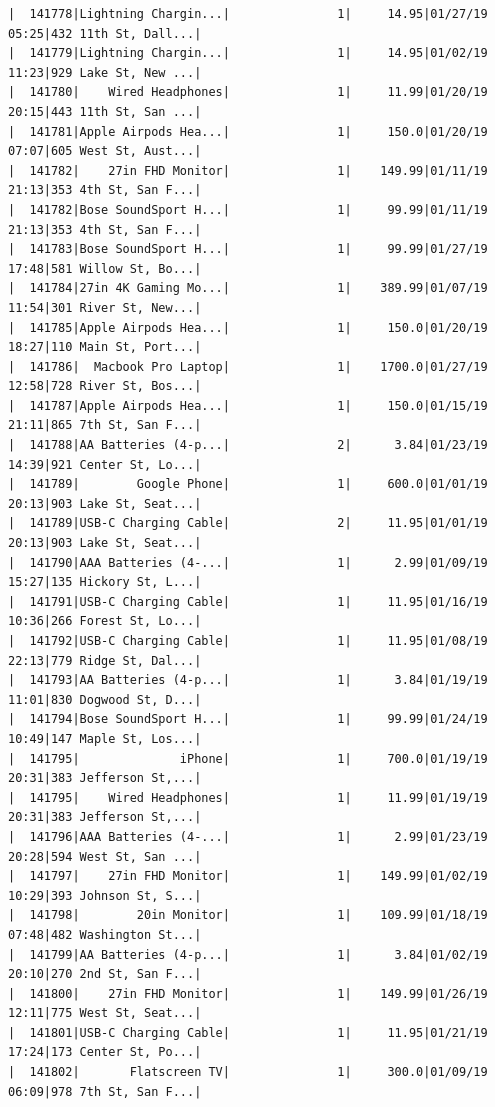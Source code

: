 \documentclass[
  letterpaper,
  DIV=11,
  numbers=noendperiod]{scrartcl}
\begin{document}
\begin{verbatim}
|  141778|Lightning Chargin...|               1|     14.95|01/27/19 05:25|432 11th St, Dall...|
|  141779|Lightning Chargin...|               1|     14.95|01/02/19 11:23|929 Lake St, New ...|
|  141780|    Wired Headphones|               1|     11.99|01/20/19 20:15|443 11th St, San ...|
|  141781|Apple Airpods Hea...|               1|     150.0|01/20/19 07:07|605 West St, Aust...|
|  141782|    27in FHD Monitor|               1|    149.99|01/11/19 21:13|353 4th St, San F...|
|  141782|Bose SoundSport H...|               1|     99.99|01/11/19 21:13|353 4th St, San F...|
|  141783|Bose SoundSport H...|               1|     99.99|01/27/19 17:48|581 Willow St, Bo...|
|  141784|27in 4K Gaming Mo...|               1|    389.99|01/07/19 11:54|301 River St, New...|
|  141785|Apple Airpods Hea...|               1|     150.0|01/20/19 18:27|110 Main St, Port...|
|  141786|  Macbook Pro Laptop|               1|    1700.0|01/27/19 12:58|728 River St, Bos...|
|  141787|Apple Airpods Hea...|               1|     150.0|01/15/19 21:11|865 7th St, San F...|
|  141788|AA Batteries (4-p...|               2|      3.84|01/23/19 14:39|921 Center St, Lo...|
|  141789|        Google Phone|               1|     600.0|01/01/19 20:13|903 Lake St, Seat...|
|  141789|USB-C Charging Cable|               2|     11.95|01/01/19 20:13|903 Lake St, Seat...|
|  141790|AAA Batteries (4-...|               1|      2.99|01/09/19 15:27|135 Hickory St, L...|
|  141791|USB-C Charging Cable|               1|     11.95|01/16/19 10:36|266 Forest St, Lo...|
|  141792|USB-C Charging Cable|               1|     11.95|01/08/19 22:13|779 Ridge St, Dal...|
|  141793|AA Batteries (4-p...|               1|      3.84|01/19/19 11:01|830 Dogwood St, D...|
|  141794|Bose SoundSport H...|               1|     99.99|01/24/19 10:49|147 Maple St, Los...|
|  141795|              iPhone|               1|     700.0|01/19/19 20:31|383 Jefferson St,...|
|  141795|    Wired Headphones|               1|     11.99|01/19/19 20:31|383 Jefferson St,...|
|  141796|AAA Batteries (4-...|               1|      2.99|01/23/19 20:28|594 West St, San ...|
|  141797|    27in FHD Monitor|               1|    149.99|01/02/19 10:29|393 Johnson St, S...|
|  141798|        20in Monitor|               1|    109.99|01/18/19 07:48|482 Washington St...|
|  141799|AA Batteries (4-p...|               1|      3.84|01/02/19 20:10|270 2nd St, San F...|
|  141800|    27in FHD Monitor|               1|    149.99|01/26/19 12:11|775 West St, Seat...|
|  141801|USB-C Charging Cable|               1|     11.95|01/21/19 17:24|173 Center St, Po...|
|  141802|       Flatscreen TV|               1|     300.0|01/09/19 06:09|978 7th St, San F...|

\end{verbatim}
\end{document}
